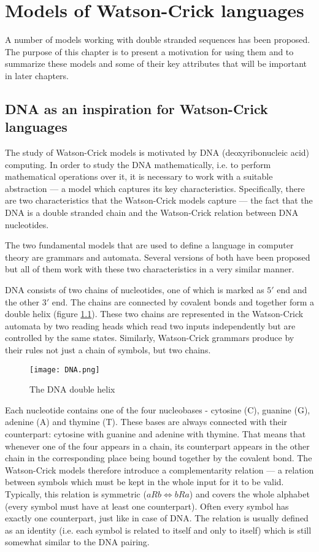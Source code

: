 \chapter{Models of Watson-Crick languages} \label{chapter:models}
A number of models working with double stranded sequences has been proposed. The purpose of this chapter is to present a motivation for using them and to summarize these models and some of their key attributes that will be important in later chapters.

\section{DNA as an inspiration for Watson-Crick languages}
The study of Watson-Crick models is motivated by DNA (deoxyribonucleic acid) computing. In order to study the DNA mathematically, i.e. to perform mathematical operations over it, it is necessary to work with a suitable abstraction --- a model which captures its key characteristics. Specifically, there are two characteristics that the Watson-Crick models capture --- the fact that the DNA is a double stranded chain and the Watson-Crick relation between DNA nucleotides.

The two fundamental models that are used to define a language in computer theory are grammars and automata. Several versions of both have been proposed but all of them work with these two characteristics in a very similar manner.

DNA consists of two chains of nucleotides, one of which is marked as $5'$ end and the other $3'$ end. The chains are connected by covalent bonds and together form a double helix (figure \ref{fig:dna}). These two chains are represented in the Watson-Crick automata by two reading heads which read two inputs independently but are controlled by the same states. Similarly, Watson-Crick grammars produce by their rules not just a chain of symbols, but two chains.

\begin{figure}[ht]
  \texttt{[image: DNA.png]}
  \centering
  \label{fig:dna}
  \caption{The DNA double helix}
\end{figure}

Each nucleotide contains one of the four nucleobases - cytosine (C), guanine (G), adenine (A) and thymine (T). These bases are always connected with their counterpart: cytosine with guanine and adenine with thymine. That means that whenever one of the four appears in a chain, its counterpart appears in the other chain in the corresponding place being bound together by the covalent bond. The Watson-Crick models therefore introduce a complementarity relation --- a relation between symbols which must be kept in the whole input for it to be valid. Typically, this relation is symmetric ($a R b \Leftrightarrow b R a$) and covers the whole alphabet (every symbol must have at least one counterpart). Often every symbol has exactly one counterpart, just like in case of DNA. The relation is usually defined as an identity (i.e. each symbol is related to itself and only to itself) which is still somewhat similar to the DNA pairing.

